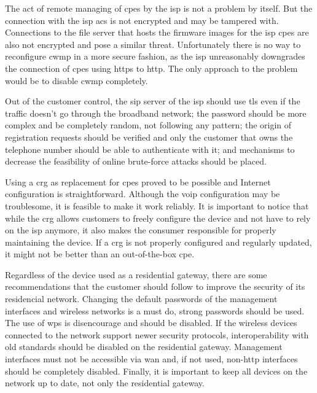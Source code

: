 The act of remote managing of \glspl{cpe} by the \gls{isp} is not a problem by itself. But the connection with the \gls{isp} \gls{acs} is not encrypted and may be tampered with. Connections to the file server that hosts the firmware images for the \gls{isp} \glspl{cpe} are also not encrypted and pose a similar threat. Unfortunately there is no way to reconfigure \gls{cwmp} in a more secure fashion, as the \gls{isp} unreasonably downgrades the connection of \glspl{cpe} using \glspl{http} to \gls{http}. The only approach to the problem would be to disable \gls{cwmp} completely.

Out of the customer control, the \gls{sip} server of the \gls{isp} should use \gls{tls} even if the traffic doesn't go through the broadband network; the password should be more complex and be completely random, not following any pattern; the origin of registration requests should be verified and only the customer that owns the telephone number should be able to authenticate with it; and mechanisms to decrease the feasibility of online brute-force attacks should be placed.

Using a \gls{crg} as replacement for \glspl{cpe} proved to be possible and Internet configuration is straightforward. Although the \gls{voip} configuration may be troublesome, it is feasible to make it work reliably. It is important to notice that while the \gls{crg} allows customers to freely configure the device and not have to rely on the \gls{isp} anymore, it also makes the consumer responsible for properly maintaining the device. If a \gls{crg} is not properly configured and regularly updated, it might not be better than an out-of-the-box \gls{cpe}.

Regardless of the device used as a residential gateway, there are some recommendations that the customer should follow to improve the security of its residencial network. Changing the default passwords of the management interfaces and wireless networks is a must do, strong passwords should be used. The use of \gls{wps} is disencourage and should be disabled. If the wireless devices connected to the network support newer security protocols, interoperability with old standards should be disabled on the residential gateway. Management interfaces must not be accessible via \gls{wan} and, if not used, non-\gls{http} interfaces should be completely disabled. Finally, it is important to keep all devices on the network up to date, not only the residential gateway.
